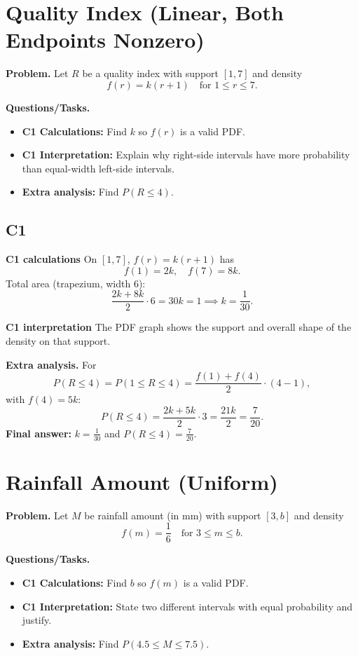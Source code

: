 	\section{Quality Index (Linear, Both Endpoints Nonzero)}
	
	\textbf{Problem.}
	Let $R$ be a quality index with support $[1,7]$ and density
	\[
	f(r)=k(r+1)\quad\text{for }1\le r\le 7.
	\]
	
	\textbf{Questions/Tasks.}
	\begin{itemize}
		\item \textbf{C1 Calculations:} Find $k$ so $f(r)$ is a valid PDF.
		\item \textbf{C1 Interpretation:} Explain why right-side intervals have more probability than equal-width left-side intervals.
		\item \textbf{Extra analysis:} Find $P(R\le 4)$.
	\end{itemize}

	\subsection*{C1}

\textbf{C1 calculations}
On $[1,7]$, $f(r)=k(r+1)$ has
	\[
	f(1)=2k,\quad f(7)=8k.
	\]
	Total area (trapezium, width $6$):
	\[
	\frac{2k+8k}{2}\cdot6=30k=1\implies k=\frac1{30}.
	\]

\textbf{C1 interpretation}
The PDF graph shows the support and overall shape of the density on that support.

\textbf{Extra analysis.}
For
\[
P(R\le4)=P(1\le R\le4)=\frac{f(1)+f(4)}{2}\cdot(4-1),
\]
with $f(4)=5k$:
\[
P(R\le4)=\frac{2k+5k}{2}\cdot3=\frac{21k}{2}=\frac7{20}.
\]
\textbf{Final answer:} $k=\frac1{30}$ and $P(R\le4)=\frac7{20}$.
	
	\section{Rainfall Amount (Uniform)}
	
	\textbf{Problem.}
	Let $M$ be rainfall amount (in mm) with support $[3,b]$ and density
	\[
	f(m)=\frac16\quad\text{for }3\le m\le b.
	\]
	
	\textbf{Questions/Tasks.}
	\begin{itemize}
		\item \textbf{C1 Calculations:} Find $b$ so $f(m)$ is a valid PDF.
		\item \textbf{C1 Interpretation:} State two different intervals with equal probability and justify.
		\item \textbf{Extra analysis:} Find $P(4.5\le M\le 7.5)$.
	\end{itemize}
	
